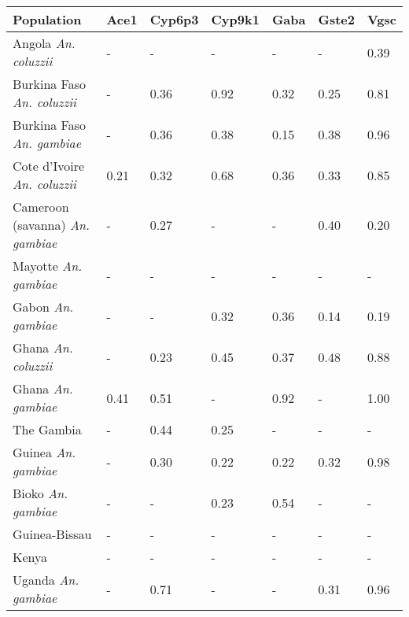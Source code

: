 \begin{tabular}{lllllll}
\toprule
                              Population & Ace1 & Cyp6p3 & Cyp9k1 & Gaba & Gste2 & Vgsc \\
\midrule
            Angola \textit{An. coluzzii} &    - &      - &      - &    - &     - & 0.39 \\
      Burkina Faso \textit{An. coluzzii} &    - &   0.36 &   0.92 & 0.32 &  0.25 & 0.81 \\
       Burkina Faso \textit{An. gambiae} &    - &   0.36 &   0.38 & 0.15 &  0.38 & 0.96 \\
     Cote d'Ivoire \textit{An. coluzzii} & 0.21 &   0.32 &   0.68 & 0.36 &  0.33 & 0.85 \\
 Cameroon (savanna) \textit{An. gambiae} &    - &   0.27 &      - &    - &  0.40 & 0.20 \\
            Mayotte \textit{An. gambiae} &    - &      - &      - &    - &     - &    - \\
              Gabon \textit{An. gambiae} &    - &      - &   0.32 & 0.36 &  0.14 & 0.19 \\
             Ghana \textit{An. coluzzii} &    - &   0.23 &   0.45 & 0.37 &  0.48 & 0.88 \\
              Ghana \textit{An. gambiae} & 0.41 &   0.51 &      - & 0.92 &     - & 1.00 \\
                              The Gambia &    - &   0.44 &   0.25 &    - &     - &    - \\
             Guinea \textit{An. gambiae} &    - &   0.30 &   0.22 & 0.22 &  0.32 & 0.98 \\
              Bioko \textit{An. gambiae} &    - &      - &   0.23 & 0.54 &     - &    - \\
                           Guinea-Bissau &    - &      - &      - &    - &     - &    - \\
                                   Kenya &    - &      - &      - &    - &     - &    - \\
             Uganda \textit{An. gambiae} &    - &   0.71 &      - &    - &  0.31 & 0.96 \\
\bottomrule
\end{tabular}
